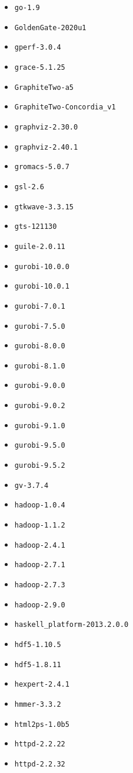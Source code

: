 \begin{multicols}{3}
\begin{itemize}
\item \verb|go-1.9|
\item \verb|GoldenGate-2020u1|
\item \verb|gperf-3.0.4|
\item \verb|grace-5.1.25|
\item \verb|GraphiteTwo-a5|
\item \verb|GraphiteTwo-Concordia_v1|
\item \verb|graphviz-2.30.0|
\item \verb|graphviz-2.40.1|
\item \verb|gromacs-5.0.7|
\item \verb|gsl-2.6|
\item \verb|gtkwave-3.3.15|
\item \verb|gts-121130|
\item \verb|guile-2.0.11|
\item \verb|gurobi-10.0.0|
\item \verb|gurobi-10.0.1|
\item \verb|gurobi-7.0.1|
\item \verb|gurobi-7.5.0|
\item \verb|gurobi-8.0.0|
\item \verb|gurobi-8.1.0|
\item \verb|gurobi-9.0.0|
\item \verb|gurobi-9.0.2|
\item \verb|gurobi-9.1.0|
\item \verb|gurobi-9.5.0|
\item \verb|gurobi-9.5.2|
\item \verb|gv-3.7.4|
\item \verb|hadoop-1.0.4|
\item \verb|hadoop-1.1.2|
\item \verb|hadoop-2.4.1|
\item \verb|hadoop-2.7.1|
\item \verb|hadoop-2.7.3|
\item \verb|hadoop-2.9.0|
\item \verb|haskell_platform-2013.2.0.0|
\item \verb|hdf5-1.10.5|
\item \verb|hdf5-1.8.11|
\item \verb|hexpert-2.4.1|
\item \verb|hmmer-3.3.2|
\item \verb|html2ps-1.0b5|
\item \verb|httpd-2.2.22|
\item \verb|httpd-2.2.32|

\end{itemize}
\end{multicols}
